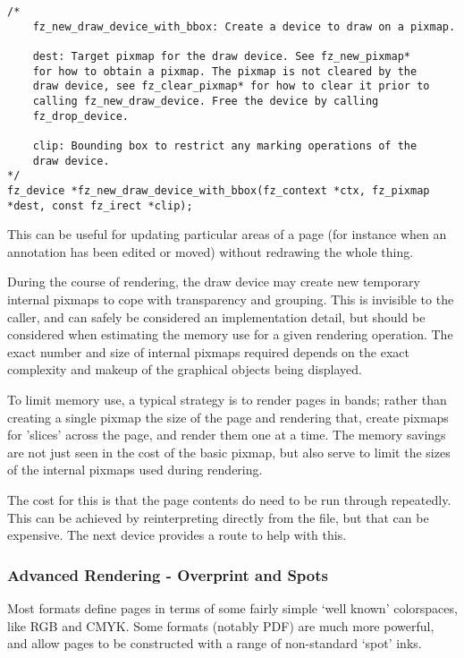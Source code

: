 \documentclass[oneside]{book}
\begin{document}
\begin{lstlisting}
/*
	fz_new_draw_device_with_bbox: Create a device to draw on a pixmap.

	dest: Target pixmap for the draw device. See fz_new_pixmap*
	for how to obtain a pixmap. The pixmap is not cleared by the
	draw device, see fz_clear_pixmap* for how to clear it prior to
	calling fz_new_draw_device. Free the device by calling
	fz_drop_device.

	clip: Bounding box to restrict any marking operations of the
	draw device.
*/
fz_device *fz_new_draw_device_with_bbox(fz_context *ctx, fz_pixmap *dest, const fz_irect *clip);
\end{lstlisting}

This can be useful for updating particular areas of a page (for instance when an annotation has been edited or moved) without redrawing the whole thing.

During the course of rendering, the draw device may create new temporary internal pixmaps to cope with transparency and grouping. This is invisible to the caller, and can safely be considered an implementation detail, but should be considered when estimating the memory use for a given rendering operation. The exact number and size of internal pixmaps required depends on the exact complexity and makeup of the graphical objects being displayed.

To limit memory use, a typical strategy is to render pages in bands; rather than creating a single pixmap the size of the page and rendering that, create pixmaps for 'slices' across the page, and render them one at a time. The memory savings are not just seen in the cost of the basic pixmap, but also serve to limit the sizes of the internal pixmaps used during rendering.

The cost for this is that the page contents do need to be run through repeatedly. This can be achieved by reinterpreting directly from the file, but that can be expensive. The next device provides a route to help with this.

\subsubsection{Advanced Rendering - Overprint and Spots}
\label{AdvancedRendering}

Most formats define pages in terms of some fairly simple `well known' colorspaces, like RGB and CMYK. Some formats (notably PDF) are much more powerful, and allow pages to be constructed with a range of non-standard `spot' inks.
\end{document}
